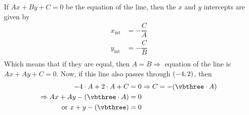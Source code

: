 \begin{solution}
   If $Ax + By + C = 0$ be the equation of the line, then the $x$ and $y$ intercepts are given by
   \begin{align}
   	  x_{\text{int}} &= -\dfrac{C}{A} \\ 
   	  y_{\text{int}} &= -\dfrac{C}{B} \\
   \end{align}
   Which means that if they are equal, then $A = B \Rightarrow$ equation of the line is $Ax + Ay + C = 0$. 
   Now, if this line also passes through $(-4, 2)$, then 
   \begin{align}
      \vbone\cdot A + \vbtwo\cdot A + C &= 0 \Rightarrow C = -(\vbthree\cdot A) \\
      \Rightarrow Ax + Ay - (\vbthree\cdot A) &= 0 \\
      \text{ or } x + y - (\vbthree) &= 0
   \end{align}
   
\end{solution}
